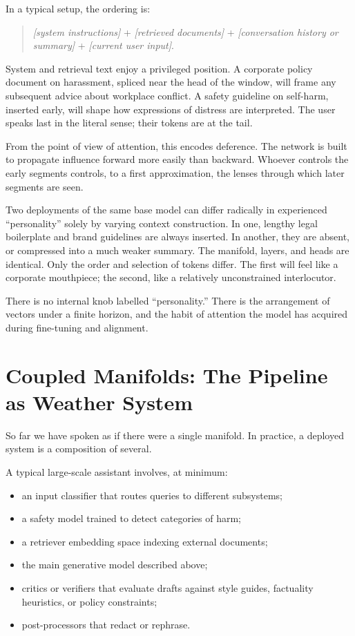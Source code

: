 \documentclass[12pt,a4paper]{article}
\begin{document}
In a typical setup, the ordering is:

\begin{quote}
\emph{[system instructions]} + \emph{[retrieved documents]} + \emph{[conversation history or summary]} + \emph{[current user input]}.
\end{quote}

System and retrieval text enjoy a privileged position. A corporate policy document on harassment, spliced near the head of the window, will frame any subsequent advice about workplace conflict. A safety guideline on self-harm, inserted early, will shape how expressions of distress are interpreted. The user speaks last in the literal sense; their tokens are at the tail.

From the point of view of attention, this encodes deference. The network is built to propagate influence forward more easily than backward. Whoever controls the early segments controls, to a first approximation, the lenses through which later segments are seen.

Two deployments of the same base model can differ radically in experienced ``personality'' solely by varying context construction. In one, lengthy legal boilerplate and brand guidelines are always inserted. In another, they are absent, or compressed into a much weaker summary. The manifold, layers, and heads are identical. Only the order and selection of tokens differ. The first will feel like a corporate mouthpiece; the second, like a relatively unconstrained interlocutor.

There is no internal knob labelled ``personality.'' There is the arrangement of vectors under a finite horizon, and the habit of attention the model has acquired during fine-tuning and alignment.

\section{Coupled Manifolds: The Pipeline as Weather System}

So far we have spoken as if there were a single manifold. In practice, a deployed system is a composition of several.

A typical large-scale assistant involves, at minimum:

\begin{itemize}
  \item an input classifier that routes queries to different subsystems;
  \item a safety model trained to detect categories of harm;
  \item a retriever embedding space indexing external documents;
  \item the main generative model described above;
  \item critics or verifiers that evaluate drafts against style guides, factuality heuristics, or policy constraints;
  \item post-processors that redact or rephrase.
\end{itemize}
\end{document}

